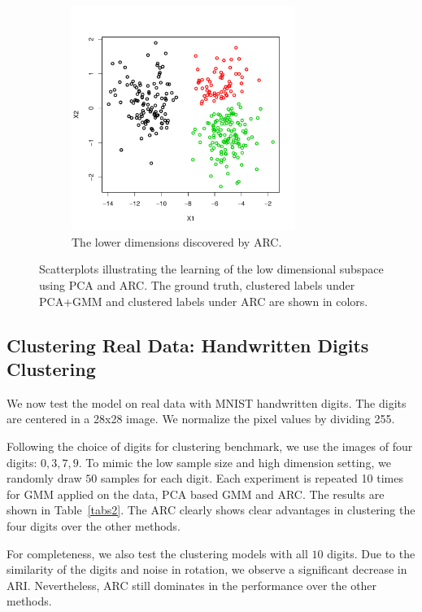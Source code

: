 \documentclass[12pt]{article}
\begin{document}
\begin{figure}[H]
\begin{subfigure}[b]{0.32\textwidth}
 \includegraphics[width=0.8\textwidth]{pics/simARCX}
  \caption{The lower dimensions discovered by ARC.}
  \label{fig:sim_arc}
\end{subfigure}
	\caption{Scatterplots illustrating the learning of the low dimensional subspace using PCA and ARC. The ground truth, clustered labels under PCA+GMM and clustered labels under ARC are shown in colors.}
 \end{figure}





\subsection{Clustering Real Data: Handwritten Digits Clustering}

We now test the model on real data with MNIST handwritten digits. The digits are centered in a 28x28 image. We normalize the pixel values by dividing 255. 

Following the choice of digits \citep{lee2015bayesian} for clustering benchmark, we use the images of four digits: $0,3,7,9$. To mimic the low sample size and high dimension setting, we randomly draw $50$ samples for each digit. Each experiment is repeated 10 times for GMM applied on the data, PCA based GMM and ARC. The results are shown in Table~\ref{tabs2}. The ARC clearly shows clear advantages in clustering the four digits over the other methods.

For completeness, we also test the clustering models with all $10$ digits. Due to the similarity of the digits and noise in rotation, we observe a significant decrease in ARI. Nevertheless, ARC still dominates in the performance over the other methods.
\end{document}
